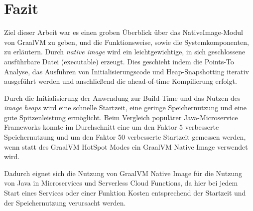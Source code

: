 \section{Fazit}
\label{sec:fazit}

Ziel dieser Arbeit war es einen groben Überblick über das NativeImage-Modul von GraalVM zu geben, und die Funktionsweise, sowie die Systemkomponenten, zu erläutern. 
Durch \textit{native image} wird ein leichtgewichtige, in sich geschlossene ausführbare Datei (executable) erzeugt. Dies geschieht indem die Points-To Analyse, das Ausführen
von Initialisierungscode und Heap-Snapshotting iterativ ausgeführt werden und anschließend die ahead-of-time Kompilierung erfolgt.

Durch die Initialisierung der Anwendung zur Build-Time und das Nutzen des \textit{image heaps} wird eine schnelle Startzeit, eine geringe Speichernutzung und eine gute Spitzenleistung
ermöglicht. Beim Vergleich populärer Java-Microservice Frameworks konnte im Durchschnitt eine um den Faktor 5 verbesserte Speichernutzung
und um den Faktor 50 verbesserte Startzeit gemessen werden, wenn statt des GraalVM HotSpot Modes ein GraalVM Native Image verwendet wird.

Dadurch eignet sich die Nutzung von GraalVM Native Image für die Nutzung von Java in Microservices und Serverless Cloud Functions, da hier bei jedem Start eines Services oder einer Funktion 
Kosten entsprechend der Startzeit und der Speichernutzung verursacht werden. 
